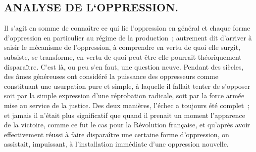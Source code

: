 \documentclass[french,twoside]{book} %
\begin{document}
\subsection[ANALYSE DE L‘OPPRESSION.]{ANALYSE DE L‘OPPRESSION.}
\noindent Il s'agit en somme de connaître ce qui lie l'oppression en général et chaque forme d'oppression en particulier au régime de la production ; autrement dit d'arriver à saisir le mécanisme de l'oppression, à comprendre en vertu de quoi elle surgit, subsiste, se transforme, en vertu de quoi peut-être elle pourrait théoriquement disparaître. C'est là, ou peu s'en faut, une question neuve. Pendant des siècles, des âmes généreuses ont considéré la puissance des oppresseurs comme constituant une usurpation pure et simple, à laquelle il fallait tenter de s'opposer soit par la simple expression d'une réprobation radicale, soit par la force armée mise au service de la justice. Des deux manières, l'échec a toujours été complet ; et jamais il n'était plus significatif que quand il prenait un moment l'apparence de la victoire, comme ce fut le cas pour la Révolution française, et qu'après avoir effectivement réussi à faire disparaître une certaine forme d'oppression, on assistait, impuissant, à l'installation immédiate d'une oppression nouvelle.\par
\end{document}
